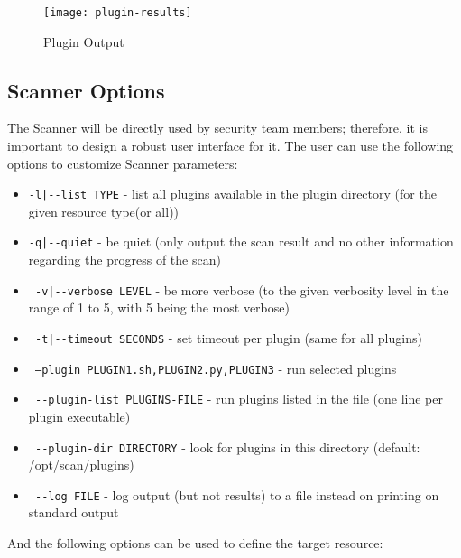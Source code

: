 \begin{figure}[h!]
  \centering
    \texttt{[image: plugin-results]}
  \caption{Plugin Output}
  \label{figure:plugin-results}
  
\end{figure}



\subsection{Scanner Options}
The Scanner will be directly used by security team members; therefore, it is important to design a robust user interface for it. The user can use the following options to customize Scanner parameters:

\begin{itemize}

\item 

    \texttt{-l|-{}-list TYPE} - list all plugins available in the plugin directory 
                       (for the given resource type(or all))
\item    \texttt{-q|-{}-quiet} - be quiet (only output the scan result and no other information regarding the progress of the scan)
\item    \texttt{    -v|-{}-verbose LEVEL} - be more verbose 
    	 				 (to the given verbosity level in the range of 1 to 5,
    	 				  with 5 being the most verbose)
\item    \texttt{    -t|-{}-timeout SECONDS} - set timeout per plugin (same for all plugins)
\item    \texttt{    --plugin PLUGIN1.sh,PLUGIN2.py,PLUGIN3} - run selected plugins
\item    \texttt{ -{}-plugin-list PLUGINS-FILE} - run plugins listed in the file (one line per plugin executable)
\item    \texttt{  -{}-plugin-dir DIRECTORY} - look for plugins in this directory (default: /opt/scan/plugins)
\item    \texttt{    -{}-log FILE} - log output (but not results) to a file instead on printing on standard output  
\end{itemize}
And the following options can be used to define the target resource:
